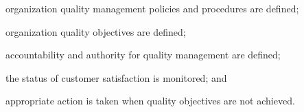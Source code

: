 			\begin{adjustwidth}{2em}{0pt} 

				\begin{compactitem}

					\item organization quality management policies and procedures are defined;

					\item organization quality objectives are defined;

					\item accountability and authority for quality management are defined;

					\item the status of customer satisfaction is monitored; and

					\item appropriate action is taken when quality objectives are not achieved.

				\end{compactitem}

			\end{adjustwidth}

